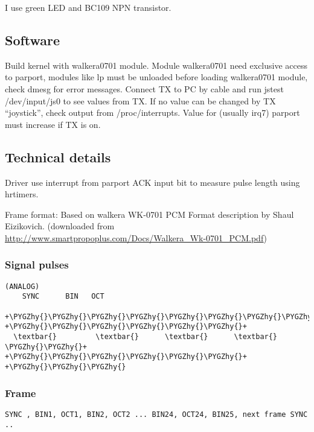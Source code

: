 \documentclass[a4paper,8pt,english]{sphinxmanual}
\def\PYGZhy{\char`\-}
\begin{document}
I use green LED and BC109 NPN transistor.


\subsection{Software}
\label{input/devices/walkera0701:software}
Build kernel with walkera0701 module. Module walkera0701 need exclusive
access to parport, modules like lp must be unloaded before loading
walkera0701 module, check dmesg for error messages. Connect TX to PC by
cable and run jstest /dev/input/js0 to see values from TX. If no value can
be changed by TX ``joystick'', check output from /proc/interrupts. Value for
(usually irq7) parport must increase if TX is on.


\subsection{Technical details}
\label{input/devices/walkera0701:technical-details}
Driver use interrupt from parport ACK input bit to measure pulse length
using hrtimers.

Frame format:
Based on walkera WK-0701 PCM Format description by Shaul Eizikovich.
(downloaded from \href{http://www.smartpropoplus.com/Docs/Walkera\_Wk-0701\_PCM.pdf}{http://www.smartpropoplus.com/Docs/Walkera\_Wk-0701\_PCM.pdf})


\subsubsection{Signal pulses}
\label{input/devices/walkera0701:signal-pulses}
\begin{Verbatim}[commandchars=\\\{\}]
                   (ANALOG)
    SYNC      BIN   OCT
  +\PYGZhy{}\PYGZhy{}\PYGZhy{}\PYGZhy{}\PYGZhy{}\PYGZhy{}\PYGZhy{}\PYGZhy{}\PYGZhy{}+      +\PYGZhy{}\PYGZhy{}\PYGZhy{}\PYGZhy{}\PYGZhy{}\PYGZhy{}+
  \textbar{}         \textbar{}      \textbar{}      \textbar{}
\PYGZhy{}\PYGZhy{}+         +\PYGZhy{}\PYGZhy{}\PYGZhy{}\PYGZhy{}\PYGZhy{}\PYGZhy{}+      +\PYGZhy{}\PYGZhy{}\PYGZhy{}
\end{Verbatim}


\subsubsection{Frame}
\label{input/devices/walkera0701:frame}
\begin{Verbatim}[commandchars=\\\{\}]
SYNC , BIN1, OCT1, BIN2, OCT2 ... BIN24, OCT24, BIN25, next frame SYNC ..
\end{Verbatim}
\end{document}
